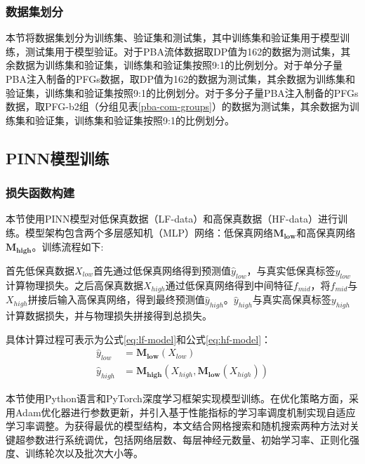 \subsubsection{数据集划分}
本节将数据集划分为训练集、验证集和测试集，其中训练集和验证集用于模型训练，测试集用于模型验证。对于PBA流体数据取DP值为162的数据为测试集，其余数据为训练集和验证集，训练集和验证集按照9:1的比例划分。对于单分子量PBA注入制备的PFGs数据，取DP值为162的数据为测试集，其余数据为训练集和验证集，训练集和验证集按照9:1的比例划分。对于多分子量PBA注入制备的PFGs数据，取PFG-b2组（分组见表\ref{pba-com-groups}）的数据为测试集，其余数据为训练集和验证集，训练集和验证集按照9:1的比例划分。

\subsection{PINN模型训练}
\subsubsection{损失函数构建}
本节使用PINN模型对低保真数据（LF-data）和高保真数据（HF-data）进行训练。模型架构包含两个多层感知机（MLP）网络：低保真网络$\mathbf{M_{low}}$和高保真网络$\mathbf{M_{high}}$。训练流程如下:

首先低保真数据$X_{low}$首先通过低保真网络得到预测值$\hat{y}_{low}$，与真实低保真标签$y_{low}$计算物理损失。之后高保真数据$X_{high}$通过低保真网络得到中间特征$f_{mid}$，将$f_{mid}$与$X_{high}$拼接后输入高保真网络，得到最终预测值$\hat{y}_{high}$。$\hat{y}_{high}$与真实高保真标签$y_{high}$计算数据损失，并与物理损失拼接得到总损失。

具体计算过程可表示为公式\eqref{eq:lf-model}和公式\eqref{eq:hf-model}：
\begin{align}
  \hat{y}_{low}  & = \mathbf{M_{low}}(X_{low}) \label{eq:lf-model}                               \\
  \hat{y}_{high} & = \mathbf{M_{high}}(X_{high}, \mathbf{M_{low}}(X_{high})) \label{eq:hf-model}
\end{align}

本节使用Python语言和PyTorch深度学习框架实现模型训练。在优化策略方面，采用Adam优化器进行参数更新，并引入基于性能指标的学习率调度机制实现自适应学习率调整。为获得最优的模型结构，本文结合网格搜索和随机搜索两种方法对关键超参数进行系统调优，包括网络层数、每层神经元数量、初始学习率、正则化强度、训练轮次以及批次大小等。

